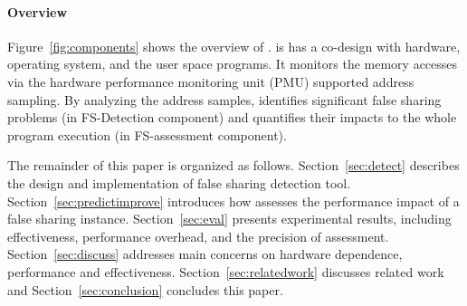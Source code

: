 %
\paragraph{\cheetah{} Overview}
Figure~\ref{fig:components} shows the overview of \Cheetah{}. \Cheetah{} is has a co-design with hardware, operating system, and the user space programs. It monitors the memory accesses via the hardware performance monitoring unit (PMU) supported address sampling. By analyzing the address samples, \cheetah{} identifies significant false sharing problems (in FS-Detection component) and quantifies their impacts to the whole program execution (in FS-assessment component).

The remainder of this paper is organized as follows. 
Section~\ref{sec:detect} describes the design and implementation of false sharing detection tool. Section~\ref{sec:predictimprove} introduces how \cheetah{} assesses the performance impact of a false sharing instance. Section~\ref{sec:eval} presents experimental results, including effectiveness, performance overhead, and the precision of assessment. Section~\ref{sec:discuss} addresses main concerns on hardware dependence, performance and effectiveness. Section~\ref{sec:relatedwork} discusses related work and Section~\ref{sec:conclusion} concludes this paper. 



